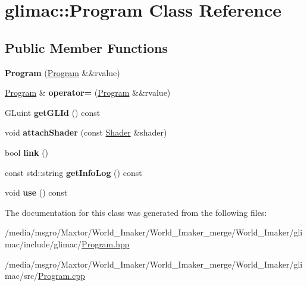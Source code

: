 \hypertarget{classglimac_1_1Program}{}\section{glimac\+:\+:Program Class Reference}
\label{classglimac_1_1Program}
\subsection*{Public Member Functions}
\begin{DoxyCompactItemize}
\item 
\mbox{\label{classglimac_1_1Program_aad59ed1f53824eda09b95fd1acdce674}} 
{\bfseries Program} (\hyperlink{classglimac_1_1Program}{Program} \&\&rvalue)
\item 
\mbox{\label{classglimac_1_1Program_a3ee1eac00a2e3fa4b6bab51d4333f33c}} 
\hyperlink{classglimac_1_1Program}{Program} \& {\bfseries operator=} (\hyperlink{classglimac_1_1Program}{Program} \&\&rvalue)
\item 
\mbox{\label{classglimac_1_1Program_ab1a519d005c77ba44876d1f309b38d18}} 
G\+Luint {\bfseries get\+G\+L\+Id} () const
\item 
\mbox{\label{classglimac_1_1Program_a5aac165d28cd6f704c01a3e0eee2119d}} 
void {\bfseries attach\+Shader} (const \hyperlink{classglimac_1_1Shader}{Shader} \&shader)
\item 
\mbox{\label{classglimac_1_1Program_a2f32f4f66ff9742750418f6fda054931}} 
bool {\bfseries link} ()
\item 
\mbox{\label{classglimac_1_1Program_aaf1769457ca41bca4afad7ecf90e9c3f}} 
const std\+::string {\bfseries get\+Info\+Log} () const
\item 
\mbox{\label{classglimac_1_1Program_a825cb4d58cccdf849730191ae5e118c6}} 
void {\bfseries use} () const
\end{DoxyCompactItemize}


The documentation for this class was generated from the following files\+:\begin{DoxyCompactItemize}
\item 
/media/msgro/\+Maxtor/\+World\+\_\+\+Imaker/\+World\+\_\+\+Imaker\+\_\+merge/\+World\+\_\+\+Imaker/glimac/include/glimac/\hyperlink{Program_8hpp}{Program.\+hpp}\item 
/media/msgro/\+Maxtor/\+World\+\_\+\+Imaker/\+World\+\_\+\+Imaker\+\_\+merge/\+World\+\_\+\+Imaker/glimac/src/\hyperlink{Program_8cpp}{Program.\+cpp}\end{DoxyCompactItemize}

